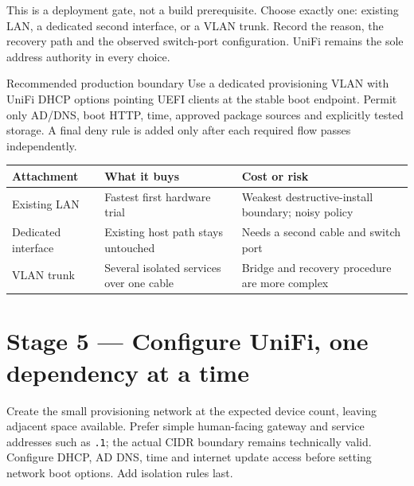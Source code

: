 This is a deployment gate, not a build prerequisite. Choose exactly one:
existing LAN, a dedicated second interface, or a VLAN trunk. Record the reason,
the recovery path and the observed switch-port configuration. UniFi remains
the sole address authority in every choice.

\begin{gate}{Recommended production boundary}
Use a dedicated provisioning VLAN with UniFi DHCP options pointing UEFI
clients at the stable boot endpoint. Permit only AD/DNS, boot HTTP, time,
approved package sources and explicitly tested storage. A final deny rule is
added only after each required flow passes independently.
\end{gate}

\begin{tabularx}{\linewidth}{@{}p{.22\linewidth}p{.31\linewidth}L@{}}
\toprule
\textbf{Attachment} & \textbf{What it buys} & \textbf{Cost or risk}\\
\midrule
Existing LAN & Fastest first hardware trial & Weakest destructive-install boundary; noisy policy\\
Dedicated interface & Existing host path stays untouched & Needs a second cable and switch port\\
VLAN trunk & Several isolated services over one cable & Bridge and recovery procedure are more complex\\
\bottomrule
\end{tabularx}


\section{Stage 5 --- Configure UniFi, one dependency at a time}

Create the small provisioning network at the expected device count, leaving
adjacent space available. Prefer simple human-facing gateway and service
addresses such as \texttt{.1}; the actual CIDR boundary remains technically
valid. Configure DHCP, AD DNS, time and internet update access before setting
network boot options. Add isolation rules last.

